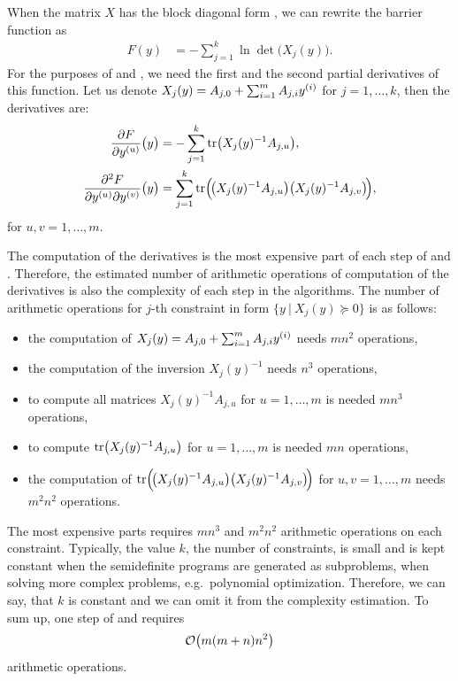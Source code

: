 When the matrix $X$ has the block diagonal form , we can rewrite the barrier function  as
\begin{align}
  F(y) &= -\sum_{j=1}^k \ln\det\!\big(X_j(y)\big).
\end{align}
For the purposes of  and , we need the first and the second partial derivatives of this function.
Let us denote $X_j(y) = A_{j, 0} + \sum_{i=1}^mA_{j, i}y^{(i)}$ for $j = 1, \ldots, k$, then the derivatives are:
\begin{align}
  \frac{\partial F}{\partial y^{(u)}}\big(y\big) &= -\sum_{j=1}^k \operatorname{tr}\!\big(X_j(y)^{-1}A_{j,u}\big),\\
  \frac{\partial^2 F}{\partial y^{(u)} \partial y^{(v)}}\big(y\big) &= \sum_{j=1}^k \operatorname{tr}\!\Big(\!\big(X_j(y)^{-1}A_{j,u}\big)\big(X_j(y)^{-1}A_{j,v}\big)\!\Big),
\end{align}
for $u, v = 1,\ldots, m$.

The computation of the derivatives is the most expensive part of each step of  and .
Therefore, the estimated number of arithmetic operations of computation of the derivatives is also the complexity of each step in the algorithms.
The number of arithmetic operations for $j$-th constraint in form $\big\{y\ |\ X_j(y) \succeq 0\big\}$ is as follows:
\begin{itemize}
  \item the computation of $X_j(y) = A_{j,0} + \sum_{i=1}^mA_{j,i}y^{(i)}$ needs $mn^2$ operations,
  \item the computation of the inversion $X_j(y)^{-1}$ needs $n^3$ operations,
  \item to compute all matrices $X_j(y)^{-1}A_{j,u}$ for $u = 1,\ldots,m$ is needed $mn^3$ operations,
  \item to compute $\operatorname{tr}\!\big(X_j(y)^{-1}A_{j,u}\big)$ for $u = 1,\ldots,m$ is needed $mn$ operations,
  \item the computation of $\operatorname{tr}\!\Big(\!\big(X_j(y)^{-1}A_{j,u}\big)\big(X_j(y)^{-1}A_{j,v}\big)\!\Big)$ for $u, v = 1,\ldots, m$ needs $m^2n^2$ operations.
\end{itemize}
The most expensive parts requires $mn^3$ and $m^2n^2$ arithmetic operations on each constraint.
Typically, the value $k$, the number of constraints, is small and is kept constant when the semidefinite programs are generated as subproblems, when solving more complex problems, e.g.\ polynomial optimization. Therefore, we can say, that $k$ is constant and we can omit it from the complexity estimation.
To sum up, one step of  and  requires
\begin{align}
  \mathcal{O}\big(m(m+n)n^2\big)\labeleq{SDP:bf:O}
\end{align}
arithmetic operations.

